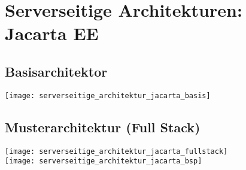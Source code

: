 
\section{Serverseitige Architekturen: Jacarta EE}
\subsection{Basisarchitektor}
\texttt{[image: serverseitige\_architektur\_jacarta\_basis]}
\subsection{Musterarchitektur (Full Stack)}
\texttt{[image: serverseitige\_architektur\_jacarta\_fullstack]}\\
\texttt{[image: serverseitige\_architektur\_jacarta\_bsp]}